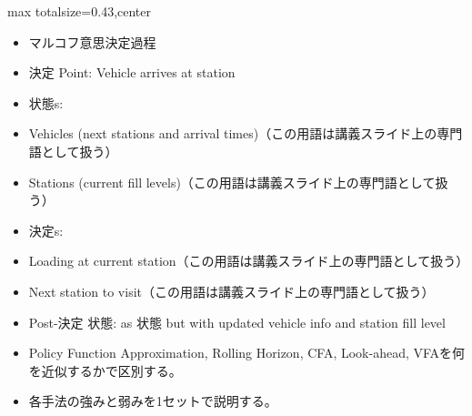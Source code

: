 \clearpage
{}
\begin{minipage}[t]{0.405\textwidth}
\begin{adjustbox}{max totalsize={\textwidth}{0.43\textheight},center}
\begin{minipage}{\textwidth}\scriptsize
{}\begin{itemize}
\item マルコフ意思決定過程
\item 決定 Point: Vehicle arrives at station
\item 状態s:
\item Vehicles (next stations and arrival times)（この用語は講義スライド上の専門語として扱う）
\item Stations (current fill levels)（この用語は講義スライド上の専門語として扱う）
\item 決定s:
\item Loading at current station（この用語は講義スライド上の専門語として扱う）
\item Next station to visit（この用語は講義スライド上の専門語として扱う）
\item Post-決定 状態: as 状態 but with updated vehicle info and station fill level
\end{itemize}\begin{itemize}
\item Policy Function Approximation, Rolling Horizon, CFA, Look-ahead, VFAを何を近似するかで区別する。
\item 各手法の強みと弱みを1セットで説明する。
\end{itemize}
\end{minipage}
\end{adjustbox}
\end{minipage}\hfill

